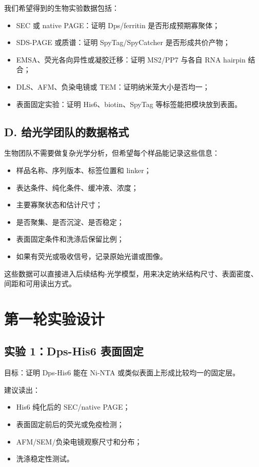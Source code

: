 \documentclass[11pt]{article}
\begin{document}
我们希望得到的生物实验数据包括：

\begin{itemize}
\item SEC 或 native PAGE：证明 Dps/ferritin 是否形成预期寡聚体；
\item SDS-PAGE 或质谱：证明 SpyTag/SpyCatcher 是否形成共价产物；
\item EMSA、荧光各向异性或凝胶迁移：证明 MS2/PP7 与各自 RNA hairpin 结合；
\item DLS、AFM、负染电镜或 TEM：证明纳米笼大小是否均一；
\item 表面固定实验：证明 His6、biotin、SpyTag 等标签能把模块放到表面。
\end{itemize}

\subsection{D. 给光学团队的数据格式}

生物团队不需要做复杂光学分析，但希望每个样品能记录这些信息：

\begin{itemize}
\item 样品名称、序列版本、标签位置和 linker；
\item 表达条件、纯化条件、缓冲液、浓度；
\item 主要寡聚状态和估计尺寸；
\item 是否聚集、是否沉淀、是否稳定；
\item 表面固定条件和洗涤后保留比例；
\item 如果有荧光或吸收信号，记录原始光谱或图像。
\end{itemize}

这些数据可以直接进入后续结构-光学模型，用来决定纳米结构尺寸、表面密度、间距和可用读出方式。

\section{第一轮实验设计}

\subsection{实验 1：Dps-His6 表面固定}

目标：证明 Dps-His6 能在 Ni-NTA 或类似表面上形成比较均一的固定层。

建议读出：

\begin{itemize}
\item His6 纯化后的 SEC/native PAGE；
\item 表面固定前后的荧光或免疫检测；
\item AFM/SEM/负染电镜观察尺寸和分布；
\item 洗涤稳定性测试。
\end{itemize}
\end{document}
